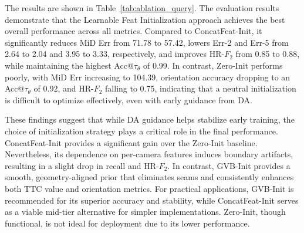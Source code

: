 \documentclass[journal]{IEEEtran}
\begin{document}
The results are shown in Table~\ref{tab:ablation_query}. The evaluation results demonstrate that the Learnable Feat Initialization approach achieves the best overall performance across all metrics. Compared to ConcatFeat-Init, it significantly reduces MiD Err from 71.78 to 57.42, lowers Err-2 and Err-5 from 2.64 to 2.04 and 3.95 to 3.33, respectively, and improves HR-\(F_2\) from 0.85 to 0.88, while maintaining the highest Acc@\(\tau_\theta\) of 0.99. In contrast, Zero-Init performs poorly, with MiD Err increasing to 104.39, orientation accuracy dropping to an Acc@\(\tau_\theta\) of 0.92, and HR-\(F_2\) falling to 0.75, indicating that a neutral initialization is difficult to optimize effectively, even with early guidance from DA.

These findings suggest that while DA guidance helps stabilize early training, the choice of initialization strategy plays a critical role in the final performance. ConcatFeat-Init provides a significant gain over the Zero-Init baseline. Nevertheless, its dependence on per-camera features induces boundary artifacts, resulting in a slight drop in recall and HR-\(F_2\). In contrast, GVB-Init provides a smooth, geometry-aligned prior that eliminates seams and consistently enhances both TTC value and orientation metrics. For practical applications, GVB-Init is recommended for its superior accuracy and stability, while ConcatFeat-Init serves as a viable mid-tier alternative for simpler implementations. Zero-Init, though functional, is not ideal for deployment due to its lower performance. 


\end{document}
